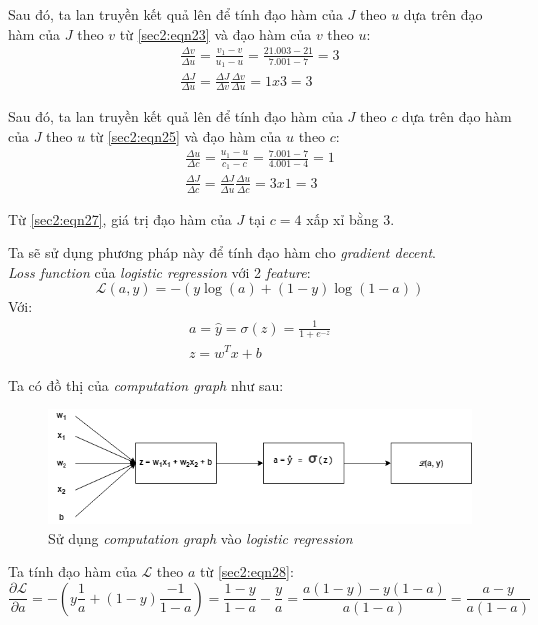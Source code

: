 Sau đó, ta lan truyền kết quả lên để tính đạo hàm của $J$ theo $u$ dựa trên đạo hàm của $J$ theo $v$ từ \ref{sec2:eqn23} và đạo hàm của $v$ theo $u$:
\begin{align}
\frac{\Delta v}{\Delta u} = \frac{v_{1} - v}{u_{1} - u} = \frac{21.003-21}{7.001-7} = 3\\
\label{sec2:eqn25}
\frac{\Delta J}{\Delta u} = \frac{\Delta J}{\Delta v}\frac{\Delta v}{\Delta u} = 1x3 = 3
\end{align}

Sau đó, ta lan truyền kết quả lên để tính đạo hàm của $J$ theo $c$ dựa trên đạo hàm của $J$ theo $u$ từ \ref{sec2:eqn25} và đạo hàm của $u$ theo $c$:
\begin{align}
\frac{\Delta u}{\Delta c} = \frac{u_{1} - u}{c_{1} - c} = \frac{7.001-7}{4.001-4} = 1\\
\label{sec2:eqn27}
\frac{\Delta J}{\Delta c} = \frac{\Delta J}{\Delta u}\frac{\Delta u}{\Delta c} = 3x1=3
\end{align}

Từ \ref{sec2:eqn27}, giá trị đạo hàm của $J$ tại $c=4$ xấp xỉ bằng 3.

Ta sẽ sử dụng phương pháp này để tính đạo hàm cho \textit{gradient decent}.\\ \textit{Loss function} của \textit{logistic regression} với 2 \textit{feature}:
\begin{equation}
\label{sec2:eqn28}
\mathcal{L}(a, y) = -(y\log (a) + (1-y)\log (1-a))
\end{equation}
Với:
\begin{align}
a = \hat{y} = \sigma (z) = \frac{1}{1+e^{-z}}\\
z = w^{T}x + b
\end{align}

Ta có đồ thị của \textit{computation graph} như sau:
\begin{figure}[!h]
\centerline{\includegraphics[scale=0.5]{chapter02/figure/com_2.png}}
\caption{Sử dụng \textit{computation graph} vào \textit{logistic regression}}
\label{fig:com_2}
\end{figure}

Ta tính đạo hàm của $\mathcal{L}$ theo $a$ từ \ref{sec2:eqn28}:
\begin{equation}
\label{sec2:eqn31}
\frac{\partial \mathcal{L}}{\partial a} = -(y\frac{1}{a} + (1-y)\frac{-1}{1-a}) = \frac{1-y}{1-a} - \frac{y}{a} = \frac{a(1-y) - y(1-a)}{a(1-a)} = \frac{a-y}{a(1-a)}
\end{equation}


